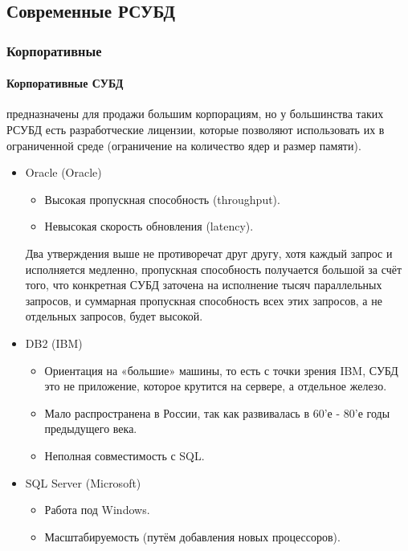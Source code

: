 \subsection{Современные РСУБД}
\subsubsection{Корпоративные}

\paragraph{Корпоративные СУБД} предназначены для продажи большим корпорациям, но у большинства
таких РСУБД есть разработческие лицензии, которые позволяют использовать их в ограниченной среде
(ограничение на количество ядер и размер памяти).

\begin{itemize}
	\item Oracle (Oracle)
	      \begin{itemize}
		      \item Высокая пропускная способность (throughput).
		      \item Невысокая скорость обновления (latency).
	      \end{itemize}
	      \begin{remark}
		      Два утверждения выше не противоречат друг другу, хотя каждый запрос и исполняется медленно,
		      пропускная способность получается большой за счёт того, что конкретная СУБД заточена на исполнение
		      тысяч параллельных запросов, и суммарная пропускная способность всех этих запросов, а не отдельных
		      запросов, будет высокой.
	      \end{remark}
	\item DB2 (IBM)
	      \begin{itemize}
		      \item Ориентация на «большие» машины, то есть с точки зрения IBM, СУБД это не приложение, которое
		            крутится на сервере, а отдельное железо.
		      \item Мало распространена в России, так как развивалась в 60'е - 80'е годы предыдущего века.
		      \item Неполная совместимость с SQL.
	      \end{itemize}
	\item SQL Server (Microsoft)
	      \begin{itemize}
		      \item Работа под Windows.
		      \item Масштабируемость (путём добавления новых процессоров).
	      \end{itemize}
\end{itemize}

